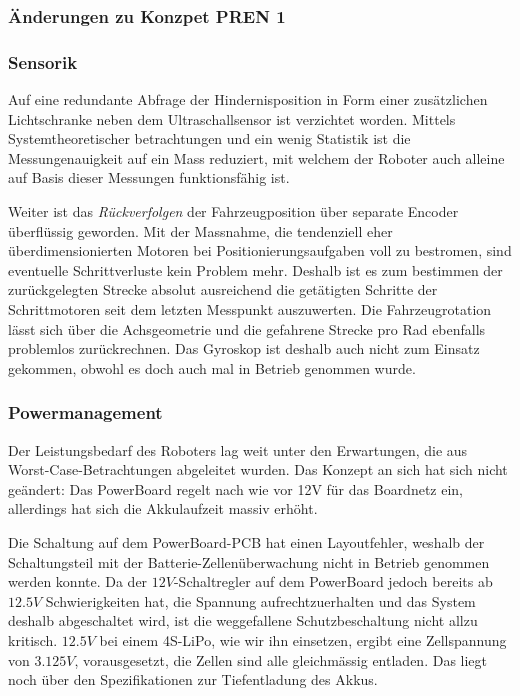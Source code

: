 \documentclass[main.tex]{subfiles} %
\begin{document}

\subsubsection{Änderungen zu Konzpet PREN 1}

\subsubsection*{Sensorik}

Auf eine redundante Abfrage der Hindernisposition in Form einer zusätzlichen
Lichtschranke neben dem Ultraschallsensor ist verzichtet worden. Mittels
Systemtheoretischer betrachtungen und ein wenig Statistik ist die
Messungenauigkeit auf ein Mass reduziert, mit welchem der Roboter auch alleine
auf Basis dieser Messungen funktionsfähig ist.

Weiter ist das \textit{Rückverfolgen} der Fahrzeugposition über separate
Encoder überflüssig geworden. Mit der Massnahme, die tendenziell eher
überdimensionierten Motoren bei Positionierungsaufgaben voll zu bestromen, sind
eventuelle Schrittverluste kein Problem mehr. Deshalb ist es zum bestimmen der
zurückgelegten Strecke absolut ausreichend die getätigten Schritte der
Schrittmotoren seit dem letzten Messpunkt auszuwerten. Die Fahrzeugrotation
lässt sich über die Achsgeometrie und die gefahrene Strecke pro Rad ebenfalls
problemlos zurückrechnen. Das Gyroskop ist deshalb auch nicht zum Einsatz
gekommen, obwohl es doch auch mal in Betrieb genommen wurde.

\subsubsection*{Powermanagement}

Der Leistungsbedarf des Roboters lag weit unter den Erwartungen, die aus
Worst-Case-Betrachtungen abgeleitet wurden. Das Konzept an sich hat sich nicht
geändert: Das PowerBoard regelt nach wie vor 12V für das Boardnetz ein,
allerdings hat sich die Akkulaufzeit massiv erhöht.

Die Schaltung auf dem PowerBoard-PCB hat einen Layoutfehler, weshalb der
Schaltungsteil mit der Batterie-Zellenüberwachung nicht in Betrieb genommen
werden konnte. Da der $12V$-Schaltregler auf dem PowerBoard jedoch bereits ab
$12.5V$ Schwierigkeiten hat, die Spannung aufrechtzuerhalten und das System
deshalb abgeschaltet wird, ist die weggefallene Schutzbeschaltung nicht allzu
kritisch. $12.5V$ bei einem 4S-LiPo, wie wir ihn einsetzen, ergibt eine
Zellspannung von $3.125V$, vorausgesetzt, die Zellen sind alle gleichmässig
entladen. Das liegt noch über den Spezifikationen zur Tiefentladung des Akkus.
\end{document}
